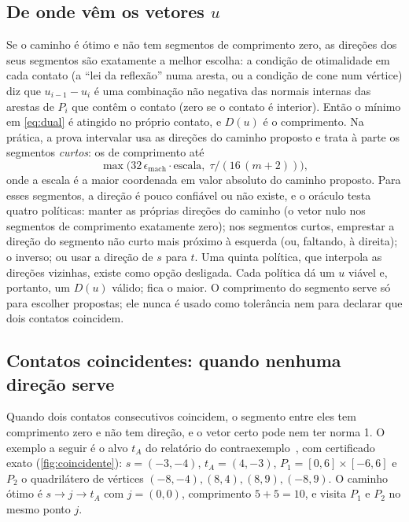 \documentclass[11pt,a4paper]{article}
\theoremstyle{plain}\newtheorem{proposicao}{Proposição}
\theoremstyle{definition}\newtheorem{definicao}{Definição}
\theoremstyle{plain}\newtheorem{teorema}{Teorema}
\begin{document}
\subsection{De onde vêm os vetores \texorpdfstring{\(u\)}{u}}\label{sec:politicas}
Se o caminho é ótimo e não tem segmentos de comprimento zero, as direções dos seus segmentos são exatamente a melhor escolha: a condição de otimalidade em cada contato (a ``lei da reflexão'' numa aresta, ou a condição de cone num vértice) diz que \(u_{i-1}-u_i\) é uma combinação não negativa das normais internas das arestas de \(P_i\) que contêm o contato (zero se o contato é interior). Então o mínimo em \eqref{eq:dual} é atingido no próprio contato, e \(D(u)\) é o comprimento. Na prática, a prova intervalar usa as direções do caminho proposto e trata à parte os segmentos \emph{curtos}: os de comprimento até
\[
\max\bigl(32\,\epsilon_{\text{mach}}\cdot \text{escala},\;\tau/(16\,(m+2))\bigr),
\]
onde a escala é a maior coordenada em valor absoluto do caminho proposto. Para esses segmentos, a direção é pouco confiável ou não existe, e o oráculo testa quatro políticas: manter as próprias direções do caminho (o vetor nulo nos segmentos de comprimento exatamente zero); nos segmentos curtos, emprestar a direção do segmento não curto mais próximo à esquerda (ou, faltando, à direita); o inverso; ou usar a direção de \(s\) para \(t\). Uma quinta política, que interpola as direções vizinhas, existe como opção desligada. Cada política dá um \(u\) viável e, portanto, um \(D(u)\) válido; fica o maior. O comprimento do segmento serve só para escolher propostas; ele nunca é usado como tolerância nem para declarar que dois contatos coincidem.

\subsection{Contatos coincidentes: quando nenhuma direção serve}\label{sec:coincidentes}
Quando dois contatos consecutivos coincidem, o segmento entre eles tem comprimento zero e não tem direção, e o vetor certo pode nem ter norma 1. O exemplo a seguir é o alvo \(t_A\) do relatório do contraexemplo~\cite{contraexemplo}, com certificado exato (\cref{fig:coincidente}): \(s=(-3,-4)\), \(t_A=(4,-3)\), \(P_1=[0,6]\times[-6,6]\) e \(P_2\) o quadrilátero de vértices \((-8,-4),(8,4),(8,9),(-8,9)\). O caminho ótimo é \(s\to j\to t_A\) com \(j=(0,0)\), comprimento \(5+5=10\), e visita \(P_1\) e \(P_2\) no mesmo ponto \(j\).
\end{document}
